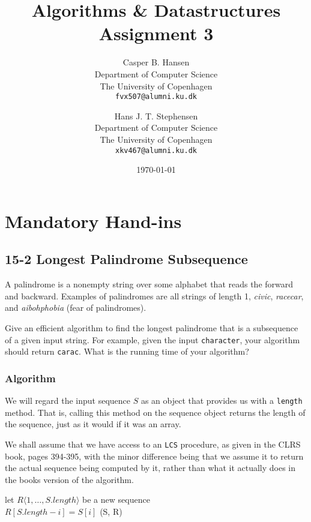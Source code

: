 \documentclass[11pt,english]{article}
\title
{
	\vspace{1in}
	Algorithms \& Datastructures\\
	\huge Assignment 3
}
\author
{
	Casper B. Hansen\\
	\small Department of Computer Science\\
	\small The University of Copenhagen\\
	\texttt{fvx507@alumni.ku.dk}
	\and
	Hans J. T. Stephensen\\
	\small Department of Computer Science\\
	\small The University of Copenhagen\\
	\texttt{xkv467@alumni.ku.dk}
}
\date{\today}
\begin{document}
\clearpage
\maketitle
\thispagestyle{empty}


\newpage
\pagestyle{fancy}

\section*{Mandatory Hand-ins}

\subsection*{15-2 Longest Palindrome Subsequence}
\large{A palindrome is a nonempty string over some alphabet that reads the
forward and backward. Examples of palindromes are all strings of length 1,
\textit{civic}, \textit{racecar}, and \textit{aibohphobia} (fear of
palindromes).

Give an efficient algorithm to find the longest palindrome that is a
subsequence of a given input string. For example, given the input
\texttt{character}, your algorithm should return \texttt{carac}. What is the
running time of your algorithm?}

\subsubsection*{Algorithm}
We will regard the input sequence $S$ as an object that provides us with a
\texttt{length} method. That is, calling this method on the sequence object
returns the length of the sequence, just as it would if it was an array.

We shall assume that we have access to an \texttt{LCS} procedure, as given in
the CLRS book, pages 394-395, with the minor difference being that we assume
it to return the actual sequence being computed by it, rather than what it
actually does in the books version of the algorithm.

\begin{algorithm}
	
	\BlankLine
	
	let $R\langle1,\dots,S.length\rangle$ be a new sequence\\ %
	
	{
		$R[S.length - i] = S[i]$
	}
	\Return \LCS(S, R) %
	
\end{algorithm}
\end{document}
